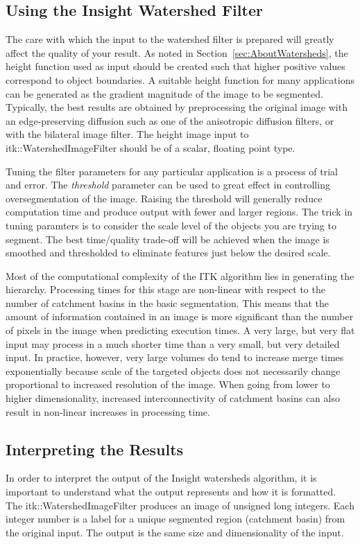 \subsection{Using the Insight Watershed Filter}
\label{sec:UsingWatersheds}
The care with which the input to the watershed filter is prepared will greatly
affect the quality of your result.  As noted in
Section~\ref{sec:AboutWatersheds}, the height function used as input should be
created such that higher positive values correspond to object boundaries.  A
suitable height function for many applications can be generated as the gradient
magnitude of the image to be segmented.  Typically, the best results are
obtained by preprocessing the original image with an edge-preserving diffusion
such as one of the anisotropic diffusion filters, or with the bilateral image
filter.  The height image input to itk::WatershedImageFilter should be of a
scalar, floating point type.

Tuning the filter parameters for any particular application is a process of
trial and error.  The {\em threshold} parameter can be used to great effect in
controlling oversegmentation of the image.  Raising the threshold will
generally reduce computation time and produce output with fewer and larger
regions.  The trick in tuning paramters is to consider the scale level of the
objects you are trying to segment.  The best time/quality trade-off will be
achieved when the image is smoothed and thresholded to eliminate features just
below the desired scale.

Most of the computational complexity of the ITK algorithm lies in generating
the hierarchy. Processing times for this stage are non-linear with respect to
the number of catchment basins in the basic segmentation.  This means that the
amount of information contained in an image is more significant than the number
of pixels in the image when predicting execution times.  A very large, but very
flat input may process in a much shorter time than a very small, but very
detailed input.  In practice, however, very large volumes do tend to increase
merge times exponentially because scale of the targeted objects does not
necessarily change proportional to increased resolution of the image.  When
going from lower to higher dimensionality, increased interconnectivity of
catchment basins can also result in non-linear increases in processing time.

\subsection{Interpreting the Results}
\label{sec:VisualizingWatersheds}
In order to interpret the output of the Insight watersheds algorithm, it is
important to understand what the output represents and how it is formatted. The
itk::WatershedImageFilter produces an image of unsigned long integers.  Each
integer number is a label for a unique segmented region (catchment basin) from
the original input.  The output is the same size and dimensionality of the
input.

